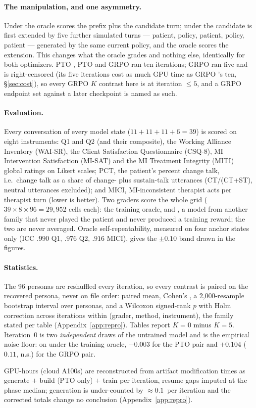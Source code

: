 \paragraph{The manipulation, and one asymmetry.} Under \Kz{} the oracle scores the prefix plus
the candidate turn; under \Kf{} the candidate is first extended by five further simulated turns
--- patient, policy, patient, policy, patient --- generated by the same current policy, and the
oracle scores the extension. This changes what the oracle grades and nothing else, identically
for both optimizers. PTO \Kz{}, PTO \Kf{} and GRPO \Kz{} ran ten iterations; GRPO \Kf{} ran five
and is right-censored (its five iterations cost as much GPU time as GRPO \Kz{}'s ten,
\S\ref{sec:cost}), so every GRPO $K$ contrast here is at iteration $\leq 5$, and a GRPO \Kf{}
endpoint set against a later \Kz{} checkpoint is named as such.

\paragraph{Evaluation.} Every conversation of every model state ($11{+}11{+}11{+}6 = 39$) is
scored on eight instruments: Q1 and Q2 (and their composite), the Working Alliance Inventory
(WAI-SR), the Client Satisfaction Questionnaire (CSQ-8), MI Intervention Satisfaction (MI-SAT)
and the MI Treatment Integrity (MITI) global ratings \citep{moyers2016miti} on Likert scales; PCT,
the patient's percent change talk, i.e.\ change talk as a share of change- plus sustain-talk
utterances (CT/(CT+ST), neutral utterances excluded); and MICI, MI-inconsistent therapist acts
per therapist turn (lower is better). Two graders
score the whole grid ($39 \times 8 \times 96 = 29{,}952$ cells each): the training oracle, and
\heldoutjudge{}, a model from another family that never played the patient and never produced a
training reward; the two are never averaged. Oracle self-repeatability, measured on four \Kz{}
anchor states only (ICC $.990$ Q1, $.976$ Q2, $.916$ MICI), gives the $\pm 0.10$ band drawn in
the figures.

\paragraph{Statistics.} The 96 personas are reshuffled every iteration, so every contrast is
paired on the recovered persona, never on file order: paired mean, Cohen's \dz{}, a
2{,}000-resample bootstrap interval over personas, and a Wilcoxon signed-rank $p$ with Holm
correction across iterations within (grader, method, instrument), the family stated per table
(Appendix~\ref{app:repro}). Tables report $K{=}0$ minus $K{=}5$. Iteration~0 is two
\emph{independent} draws of the untrained model and is the empirical noise floor: on \QQ{} under
the training oracle, $-0.003$ for the PTO pair and $+0.104$ (\dz{} $0.11$, n.s.) for the GRPO
pair.

GPU-hours (cloud A100s) are reconstructed from artifact modification times as generate $+$
build (PTO only) $+$ train per iteration, resume gaps imputed at the phase median; generation is
under-counted by ${\approx}0.1$\,\gpuh{} per iteration and the corrected totals change no
conclusion (Appendix~\ref{app:repro}).
